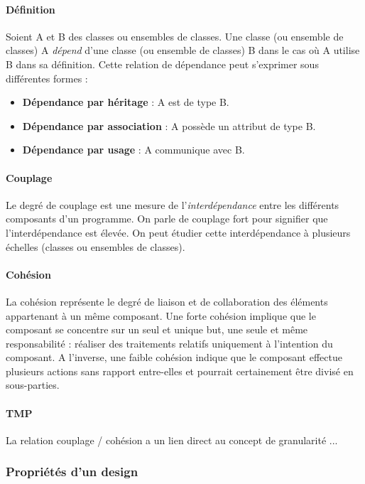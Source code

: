 \documentclass{scrartcl}
\begin{document}
    \paragraph{Définition}Soient A et B des classes ou ensembles de classes. Une classe (ou ensemble de classes) A \emph{dépend} d'une classe (ou ensemble de classes) B dans le cas où A utilise B dans sa définition. Cette relation de dépendance peut s'exprimer sous différentes formes :
    \begin{itemize}
        \item \textbf{Dépendance par héritage} : A est de type B.
        \item \textbf{Dépendance par association} : A possède un attribut de type B.
        \item \textbf{Dépendance par usage} : A communique avec B. 
    \end{itemize}

    \paragraph{Couplage}Le degré de couplage est une mesure de l'\emph{interdépendance} entre les différents composants d'un programme. On parle de couplage fort pour signifier que l'interdépendance est élevée. On peut étudier cette interdépendance à plusieurs échelles (classes ou ensembles de classes).

    \paragraph{Cohésion}La cohésion représente le degré de liaison et de collaboration des éléments appartenant à un même composant. Une forte cohésion implique que le composant se concentre sur un seul et unique but, une seule et même responsabilité : réaliser des traitements relatifs uniquement à l’intention du composant. A l'inverse, une faible cohésion indique que le composant effectue plusieurs actions sans rapport entre-elles et pourrait certainement être divisé en sous-parties.
    
    \paragraph{TMP}La relation couplage / cohésion a un lien direct au concept de granularité ...

\subsubsection{Propriétés d'un design}
\end{document}
